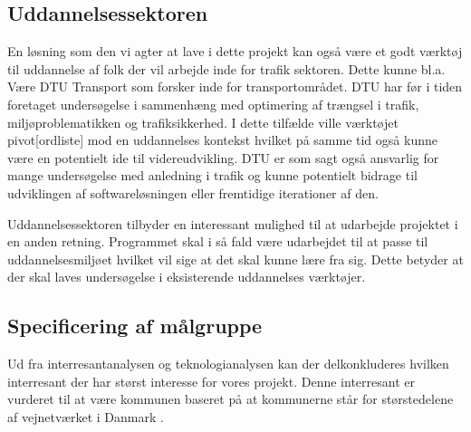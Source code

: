 \subsection{Uddannelsessektoren}
En løsning som den vi agter at lave i dette projekt kan også være et godt værktøj til uddannelse af folk der vil arbejde inde for trafik sektoren. Dette kunne bl.a. Være DTU Transport som forsker inde for transportområdet. DTU har før i tiden foretaget undersøgelse i sammenhæng med optimering af trængsel i trafik, miljøproblematikken og trafiksikkerhed\cite{DtuForskning}. I dette tilfælde ville værktøjet pivot[ordliste] mod en uddannelses kontekst hvilket på samme tid også kunne være en potentielt ide til videreudvikling. DTU er som sagt også ansvarlig for mange undersøgelse med anledning i trafik og kunne potentielt bidrage til udviklingen af softwareløsningen eller fremtidige iterationer af den.

\vspace{5mm}

Uddannelsessektoren tilbyder en interessant mulighed til at udarbejde projektet i en anden retning. Programmet skal i så fald være udarbejdet til at passe til uddannelsesmiljøet hvilket vil sige at det skal kunne lære fra sig. Dette betyder at der skal laves undersøgelse i eksisterende uddannelses værktøjer.

\subsection{Specificering af målgruppe}

Ud fra interresantanalysen og teknologianalysen kan der delkonkluderes hvilken interresant der har størst interesse for vores projekt. Denne interresant er vurderet til at være kommunen baseret på at kommunerne står for størstedelene af vejnetværket i Danmark \cite{benjasfar}. 
